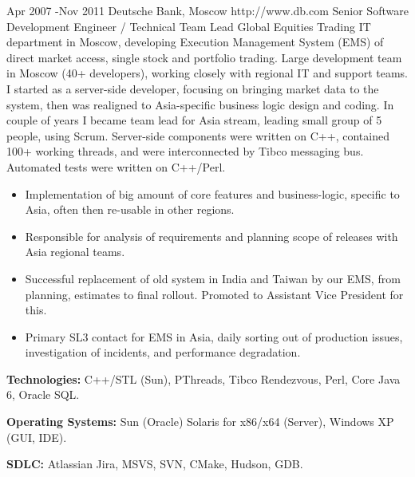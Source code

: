 \documentclass[10pt]{article} %
\begin{document}
\job
{Apr 2007 -}{Nov 2011}
{Deutsche Bank, Moscow}
{http://www.db.com}
{Senior Software Development Engineer / Technical Team Lead}
{Global Equities Trading IT department in Moscow, developing Execution Management System (EMS) of direct market access,
single stock and portfolio trading. Large development team in Moscow (40+ developers), working closely with regional IT 
and support teams. I started as a server-side developer, focusing on bringing market data to the system, then was realigned
to Asia-specific business logic design and coding. In couple of years I became team lead for Asia stream, 
leading small group of 5 people, using Scrum. Server-side components were written on C++, contained 100+ working threads,
and were interconnected by Tibco messaging bus. Automated tests were written on C++/Perl.}
{\begin{itemize}
\item{Implementation of big amount of core features and business-logic, specific to Asia, often then re-usable in other regions.}
\item{Responsible for analysis of requirements and planning scope of releases with Asia regional teams.}
\item{Successful replacement of old system in India and Taiwan by our EMS, from planning, estimates to final rollout.
Promoted to Assistant Vice President for this.}
\item{Primary SL3 contact for EMS in Asia, daily sorting out of production issues, investigation of incidents,
and performance degradation.}
\end{itemize}}
{\rule{0mm}{5mm}\textbf{Technologies:} C++/STL (Sun), PThreads, Tibco Rendezvous, Perl, Core Java 6, Oracle SQL.\\
\rule{0mm}{5mm}\textbf{Operating Systems:} Sun (Oracle) Solaris for x86/x64 (Server), Windows XP (GUI, IDE).\\
\rule{0mm}{5mm}\textbf{SDLC:} Atlassian Jira, MSVS, SVN, CMake, Hudson, GDB.
}

\end{document}
